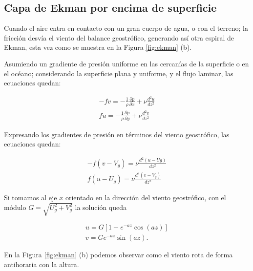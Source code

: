 \documentclass[openany,a4]{book}
\begin{document}
\subsection{Capa de Ekman por encima de superficie}
Cuando el aire entra en contacto con un gran cuerpo de agua, o con el
terreno; la fricción desvía el viento del balance geostrófico,
generando así otra espiral de Ekman, esta vez como se muestra en la
Figura \ref{fig:ekman} (b).
\par Asumiendo un gradiente de presión uniforme en las cercanías de
la superficie o en el océano; considerando la superficie plana y
uniforme, y el flujo laminar, las ecuaciones quedan:

\begin{gather}
    -fv=-\frac{1}{\rho}\frac{\partial p}{\partial x}+\nu \frac{d^2u}{dz^2}\\
    fu=-\frac{1}{\rho}\frac{\partial p}{\partial y}+\nu \frac{d^2v}{dz^2}
\end{gather}

\par Expresando los gradientes de presión en términos del viento
geostrófico, las ecuaciones quedan:

\begin{gather}
    -f(v-V_{g})=\nu\frac{d^2(u-U{g})}{dz^2}\\
    f(u-U_{g})=\nu\frac{d^2(v-V_{g})}{dz^2}
\end{gather}

\par Si tomamos al eje $x$ orientado en la dirección del viento
geostrófico, con el módulo $G=\sqrt{U_{g}^2+V_{g}^2}$ la solución 
queda

\begin{gather}
    u=G[1-e^{-az}\cos{(az)}]\\
    v=Ge^{-az}\sin{(az)}.
\end{gather}

\par En la Figura \ref{fig:ekman} (b) podemos observar como el viento
rota de forma antihoraria con la altura.

\end{document}
